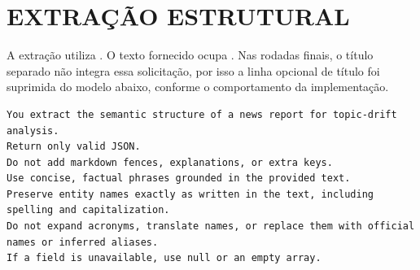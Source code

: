 \section{EXTRAÇÃO ESTRUTURAL}

A extração utiliza . O texto fornecido ocupa . Nas rodadas finais, o título separado não integra essa solicitação, por isso a linha opcional de título foi suprimida do modelo abaixo, conforme o comportamento da implementação.

\begin{lstlisting}[title={Instrução de sistema da extração estrutural}]
You extract the semantic structure of a news report for topic-drift analysis.
Return only valid JSON.
Do not add markdown fences, explanations, or extra keys.
Use concise, factual phrases grounded in the provided text.
Preserve entity names exactly as written in the text, including spelling and capitalization.
Do not expand acronyms, translate names, or replace them with official names or inferred aliases.
If a field is unavailable, use null or an empty array.
\end{lstlisting}
